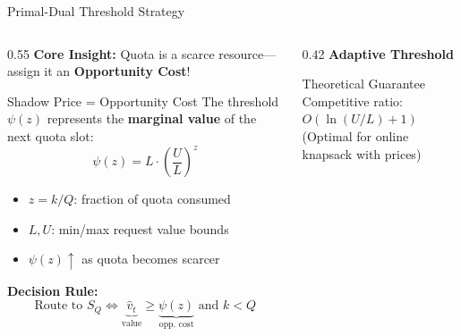 \documentclass[aspectratio=169,10pt]{beamer}
\begin{document}
\begin{frame}{Primal-Dual Threshold Strategy}
\begin{columns}[T]
\begin{column}{0.55\textwidth}
\textbf{Core Insight:} Quota is a \alert{scarce resource}---assign it an \textbf{Opportunity Cost}!

\vspace{0.1cm}
\begin{block}{Shadow Price = Opportunity Cost}
\small
The threshold $\psi(z)$ represents the \textbf{marginal value} of the next quota slot:
\begin{equation*}
\psi(z) = L \cdot \left(\frac{U}{L}\right)^z
\end{equation*}
\begin{itemize}\setlength{\itemsep}{1pt}
    \item $z = k/Q$: fraction of quota consumed
    \item $L, U$: min/max request value bounds
    \item $\psi(z) \uparrow$ as quota becomes scarcer
\end{itemize}
\end{block}

\vspace{0.1cm}
\textbf{Decision Rule:}
\begin{equation*}
\text{Route to } S_Q \iff \underbrace{\hat{v}_t}_{\text{value}} \geq \underbrace{\psi(z)}_{\text{opp. cost}} \text{ and } k < Q
\end{equation*}
\end{column}

\begin{column}{0.42\textwidth}
\centering
\textbf{Adaptive Threshold}

\vspace{0.1cm}
\begin{alertblock}{Theoretical Guarantee}
\small
Competitive ratio: $O(\ln(U/L) + 1)$\\
(Optimal for online knapsack with prices)
\end{alertblock}
\end{column}
\end{columns}
\end{frame}
\end{document}
